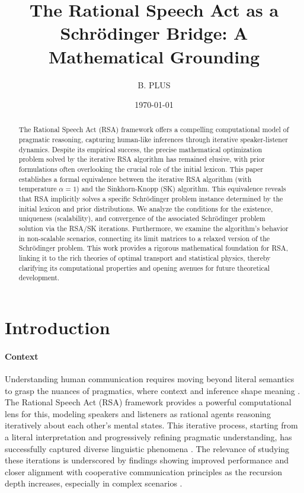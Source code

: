 \documentclass{article}
\begin{document}
\title{The Rational Speech Act as a Schrödinger Bridge: A Mathematical Grounding}
\author{B. PLUS} %
\date{\today} %
\maketitle

\begin{abstract}
The Rational Speech Act (RSA) framework offers a compelling computational model of pragmatic reasoning, capturing human-like inferences through iterative speaker-listener dynamics. Despite its empirical success, the precise mathematical optimization problem solved by the iterative RSA algorithm has remained elusive, with prior formulations often overlooking the crucial role of the initial lexicon. This paper establishes a formal equivalence between the iterative RSA algorithm (with temperature $\alpha=1$) and the Sinkhorn-Knopp (SK) algorithm. This equivalence reveals that RSA implicitly solves a specific Schrödinger problem instance determined by the initial lexicon and prior distributions. We analyze the conditions for the existence, uniqueness (scalability), and convergence of the associated Schrödinger problem solution via the RSA/SK iterations. Furthermore, we examine the algorithm's behavior in non-scalable scenarios, connecting its limit matrices to a relaxed version of the Schrödinger problem. This work provides a rigorous mathematical foundation for RSA, linking it to the rich theories of optimal transport and statistical physics, thereby clarifying its computational properties and opening avenues for future theoretical development.
\end{abstract}

\section{Introduction}
\paragraph{Context} Understanding human communication requires moving beyond literal semantics to grasp the nuances of pragmatics, where context and inference shape meaning \cite{grice_logic_1975}. The Rational Speech Act (RSA) framework \cite{frank_predicting_2012} provides a powerful computational lens for this, modeling speakers and listeners as rational agents reasoning iteratively about each other's mental states. This iterative process, starting from a literal interpretation and progressively refining pragmatic understanding, has successfully captured diverse linguistic phenomena \cite{goodman_pragmatic_2016, degen_rational_2023}. The relevance of studying these iterations is underscored by findings showing improved performance and closer alignment with cooperative communication principles as the recursion depth increases, especially in complex scenarios \cite{wang2020mathematicaltheorycooperativecommunication}.
\end{document}
